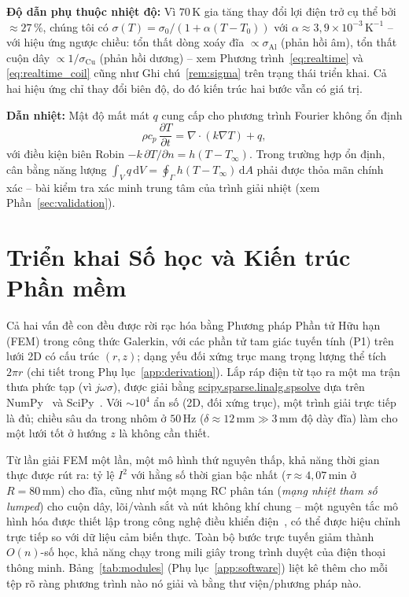 \documentclass[a4paper, 10pt, conference]{ieeeconf}
\theoremstyle{remark}
\begin{document}
\textbf{Độ dẫn phụ thuộc nhiệt độ:} Vì $70\,\mathrm K$ gia tăng thay đổi lợi
điện trở cụ thể bởi $\approx27\,\%$, chúng tôi có $\sigma(T)=\sigma_0/(1+\alpha(T-T_0))$
với $\alpha\approx3{,}9\times10^{-3}\,\mathrm{K^{-1}}$ -- với hiệu ứng ngược chiều:
tổn thất dòng xoáy đĩa $\propto\sigma_{\mathrm{Al}}$ (phản hồi âm), tổn thất cuộn
dây $\propto1/\sigma_{\mathrm{Cu}}$ (phản hồi dương) -- xem Phương trình~\eqref{eq:realtime}
và \eqref{eq:realtime_coil} cũng như Ghi chú~\ref{rem:sigma} trên trạng thái triển
khai. Cả hai hiệu ứng chỉ thay đổi biên độ, do đó kiến trúc hai bước vẫn có giá trị.

\textbf{Dẫn nhiệt:} Mật độ mất mát $q$ cung cấp cho phương trình Fourier không
ổn định
\begin{equation}
  \rho c_p\,\frac{\partial T}{\partial t} = \nabla\!\cdot\!(k\nabla T) + q,
  \label{eq:fourier}
\end{equation}
với điều kiện biên Robin $-k\,\partial T/\partial n=h(T-T_\infty)$. Trong trường
hợp ổn định, cân bằng năng lượng $\int_V q\,\mathrm dV=\oint_\Gamma h(T-T_\infty)\,\mathrm dA$
phải được thỏa mãn chính xác -- bài kiểm tra xác minh trung tâm của trình giải
nhiệt (xem Phần~\ref{sec:validation}).


\section{Triển khai Số học và Kiến trúc Phần mềm}
\label{sec:numerics}

Cả hai vấn đề con đều được rời rạc hóa bằng Phương pháp Phần tử Hữu hạn (FEM)
trong công thức Galerkin, với các phần tử tam giác tuyến tính (P1) trên lưới 2D
có cấu trúc $(r,z)$; dạng yếu đối xứng trục mang trọng lượng thể tích $2\pi r$ (chi
tiết trong Phụ lục~\ref{app:derivation}). Lắp ráp điện từ tạo ra một ma trận thưa
phức tạp (vì $j\omega\sigma$), được giải bằng \url{scipy.sparse.linalg.spsolve}
dựa trên NumPy~\cite{harris2020numpy} và SciPy~\cite{virtanen2020scipy}. Với
$\sim\!10^4$ ẩn số (2D, đối xứng trục), một trình giải trực tiếp là đủ; chiều sâu
da trong nhôm ở $50\,\mathrm{Hz}$ ($\delta\approx12\,\mathrm{mm}\gg3\,\mathrm{mm}$
độ dày đĩa) làm cho một lưới tốt ở hướng $z$ là không cần thiết.

Từ lần giải FEM một lần, một mô hình thứ nguyên thấp, khả năng thời gian thực được
rút ra: tỷ lệ $I^2$ với hằng số thời gian bậc nhất ($\tau\approx4{,}07\,\mathrm{min}$
ở $R=80\,\mathrm{mm}$) cho đĩa, cũng như một mạng RC phân tán (\emph{mạng nhiệt
tham số lumped}) cho cuộn dây, lõi/vành sắt và nút không khí chung -- một nguyên
tắc mô hình hóa được thiết lập trong công nghệ điều khiển điện~\cite{wallscheid2021thermal},
có thể được hiệu chỉnh trực tiếp so với dữ liệu cảm biến thực. Toàn bộ bước trực
tuyến giảm thành $O(n)$-số học, khả năng chạy trong mili giây trong trình duyệt của
điện thoại thông minh. Bảng~\ref{tab:modules} (Phụ lục~\ref{app:software}) liệt kê
thêm cho mỗi tệp rõ ràng phương trình nào nó giải và bằng thư viện/phương pháp nào.
\end{document}
